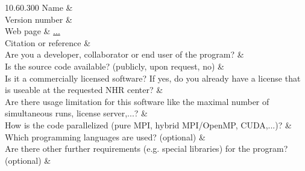 \documentclass[whitelistedextension,showhints]{nhrproposal}
\begin{document}
\Titlepage

\ProgressReport
\ProgressReportSummary
{}
\SubprojectReportProgress
\SubprojectReportChallenges
\SubprojectReportProblems


\ProgressImprovements

\ShortProjectExtensionDescription
{}

\ComputeResourcesExtension
\CodeOverview
\begin{Codetable}{1}{0.6\linewidth}{0.3\linewidth}{0}{0} %
 Name           &  \\ \hline
 Version number &  \\ \hline
 Web page       & \url{...}   \\ \hline
 Citation or reference &   \\ \hline 
 Are you a developer, collaborator or end user of the program? &   \\ \hline
 Is the source code available? (publicly, upon request, no) &   \\ \hline
 Is it a commercially licensed software? If yes, do you already have a license that is useable at the requested NHR center?  &  \\ \hline
 Are there usage limitation for this software like the maximal number of simultaneous runs, license server,...?  &  \\ \hline
 How is the code parallelized (pure MPI, hybrid MPI/OpenMP, CUDA,...)? &  \\ \hline
 Which programming languages are used? (optional) &  \\ \hline
 Are there other further requirements (e.g. special libraries) for the program? (optional) &   \\ \hline
\end{Codetable}

\CodeBenchmarks
{}
\BenchmarkDescription
\end{document}

